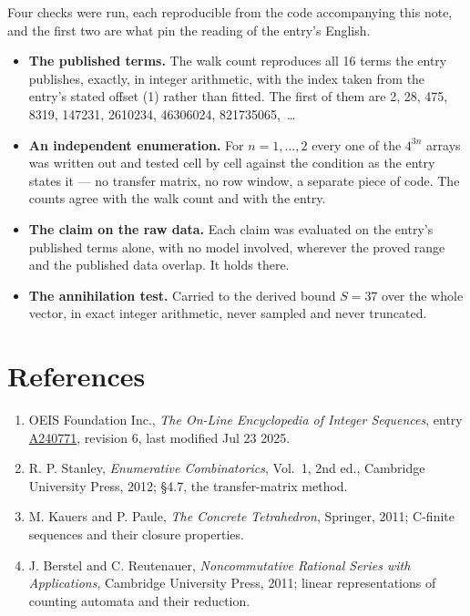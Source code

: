 \documentclass[11pt]{article}
\theoremstyle{definition}
\begin{document}
Four checks were run, each reproducible from the code accompanying this note, and the first two are what pin the reading of the entry's English.

\begin{itemize}

\item {\bfseries The published terms.} The walk count reproduces all 16 terms the entry publishes, exactly, in integer arithmetic, with the index taken from the entry's stated offset (1) rather than fitted. The first of them are 2, 28, 475, 8319, 147231, 2610234, 46306024, 821735065,~\dots

\item {\bfseries An independent enumeration.} For $n = 1,\dots,2$ every one of the $4^{3n}$ arrays was written out and tested cell by cell against the condition as the entry states it --- no transfer matrix, no row window, a separate piece of code. The counts agree with the walk count and with the entry.

\item {\bfseries The claim on the raw data.} Each claim was evaluated on the entry's published terms alone, with no model involved, wherever the proved range and the published data overlap. It holds there.

\item {\bfseries The annihilation test.} Carried to the derived bound $S = 37$ over the whole vector, in exact integer arithmetic, never sampled and never truncated.

\end{itemize}

\section{References}

\begin{enumerate}

\item OEIS Foundation Inc., \emph{The On-Line Encyclopedia of Integer Sequences}, entry \href{https://oeis.org/A240771}{A240771}, revision 6, last modified Jul 23 2025.

\item R. P. Stanley, \emph{Enumerative Combinatorics}, Vol.~1, 2nd ed., Cambridge University Press, 2012; \S4.7, the transfer-matrix method.

\item M. Kauers and P. Paule, \emph{The Concrete Tetrahedron}, Springer, 2011; C-finite sequences and their closure properties.

\item J. Berstel and C. Reutenauer, \emph{Noncommutative Rational Series with Applications}, Cambridge University Press, 2011; linear representations of counting automata and their reduction.

\end{enumerate}
\end{document}
